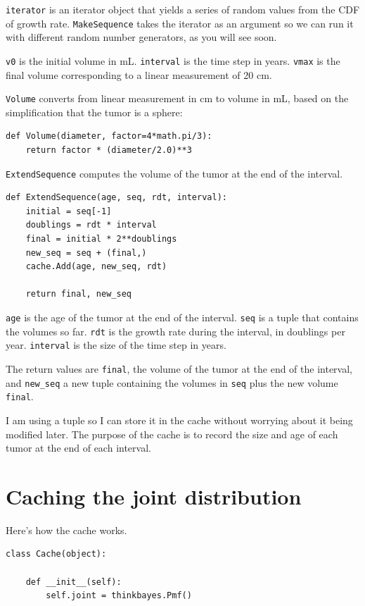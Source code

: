 \documentclass[12pt]{book}
\begin{document}
{\tt iterator} is an iterator object that yields a series of
random values from the CDF of growth rate.  {\tt MakeSequence}
takes the iterator as an argument so we can run it with
different random number generators, as you will see soon.

{\tt v0} is the initial volume in mL.  {\tt interval} is the time step
in years.  {\tt vmax} is the final volume corresponding to a linear
measurement of 20 cm.

{\tt Volume} converts from linear measurement in cm to volume
in mL, based on the simplification that the tumor is a sphere:

\begin{verbatim}
def Volume(diameter, factor=4*math.pi/3):
    return factor * (diameter/2.0)**3
\end{verbatim}

{\tt ExtendSequence} computes the volume of the tumor at the
end of the interval.

\begin{verbatim}
def ExtendSequence(age, seq, rdt, interval):
    initial = seq[-1]
    doublings = rdt * interval
    final = initial * 2**doublings
    new_seq = seq + (final,)
    cache.Add(age, new_seq, rdt)
    
    return final, new_seq
\end{verbatim}

{\tt age} is the age of the tumor at the end of the interval.
{\tt seq} is a tuple that contains the volumes so far.  {\tt rdt} is
the growth rate during the interval, in doublings per year.
{\tt interval} is the size of the time step in years.

The return values are {\tt final}, the volume of the
tumor at the end of the interval, and \verb"new_seq" a new
tuple containing the volumes in {\tt seq} plus the new volume
{\tt final}.

I am using a tuple so I can store it in the cache without
worrying about it being modified later.  The purpose of the
cache is to record the size and age of each tumor at the end
of each interval.


\section{Caching the joint distribution}

Here's how the cache works.  

\begin{verbatim}
class Cache(object):

    def __init__(self):
        self.joint = thinkbayes.Pmf()
\end{verbatim}
\end{document}
